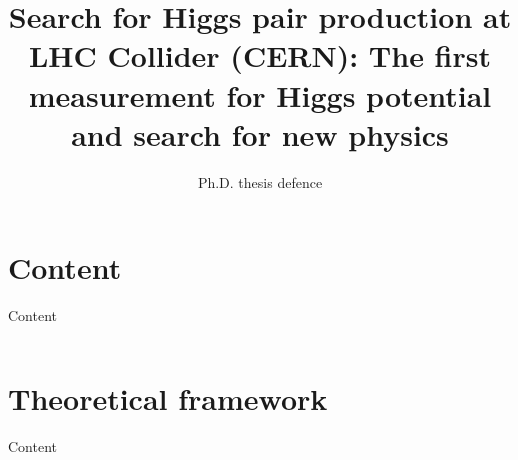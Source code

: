 \documentclass[10pt,aspectratio=169]{beamer}
\title{\textcolor{HHwhite}{Search for Higgs pair production at LHC Collider (CERN): The first measurement for Higgs potential and search for new physics}}
\subtitle{\textcolor{HHwhite}{Ph.D. thesis defence}}
\author{ 
\textcolor{HHwhite}{
{\textbf{Mohamed BELFKIR}} \\
{\and} \\
{\textit{Supervised by}} \\
{\textsf{St\'ephane JEZEQUEL}}
}
}
\date{}
\begin{document}
{
\begin{frame}
\titlepage
\end{frame}
}

\section*{Content}
\begin{frame}{Content}
\label{content}
    \begin{columns}[t]
        \begin{column}{.5\textwidth}
            \tableofcontents[sections={1-5}]
        \end{column}
        \begin{column}{.5\textwidth}
            \tableofcontents[sections={6-}]
        \end{column}
    \end{columns}
\end{frame}

\section{Theoretical framework}
\begin{frame}{Content}
\label{content}
    \begin{columns}[t]
        \begin{column}{.5\textwidth}
            \tableofcontents[sections={1-5},currentsection]
        \end{column}
        \begin{column}{.5\textwidth}
            \tableofcontents[sections={6-},currentsection]
        \end{column}
    \end{columns}
\end{frame}

\end{document}
